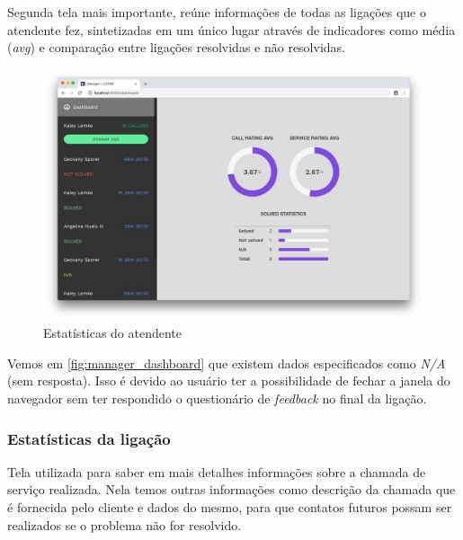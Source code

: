 Segunda tela mais importante, reúne informações de todas as ligações que o atendente fez, sintetizadas em um único lugar através de indicadores como média (\textit{avg}) e comparação entre ligações resolvidas e não resolvidas. 

\begin{figure}[ht!]
	\centering
    \includegraphics[scale=0.3]{figures/screens/manager-dashboard.jpg}
	\caption{Estatísticas do atendente}
	\label{fig:manager_dashboard}
\end{figure}


Vemos em \autoref{fig:manager_dashboard} que existem dados especificados como \textit{N/A} (sem resposta). Isso é devido ao usuário ter a possibilidade de fechar a janela do navegador sem ter respondido o questionário de \textit{feedback} no final da ligação.

\clearpage
\subsubsection{Estatísticas da ligação}

Tela utilizada para saber em mais detalhes informações sobre a chamada de serviço realizada. Nela temos outras informações como descrição da chamada que é fornecida pelo cliente e dados do mesmo, para que contatos futuros possam ser realizados se o problema não for resolvido.

